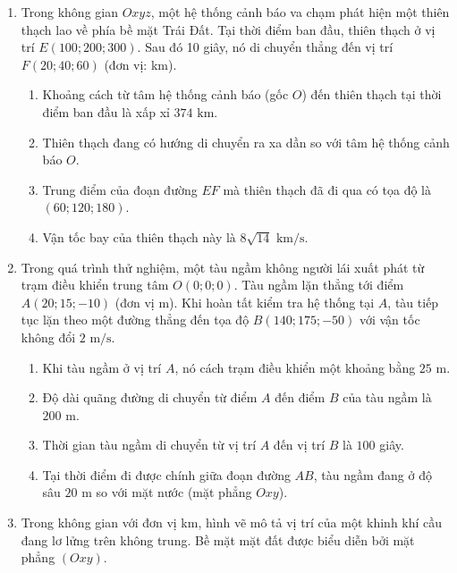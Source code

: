\documentclass[12pt]{article}
\begin{document}
\begin{enumerate}[label=\textbf{Câu \arabic*:}, leftmargin=*]
		\vspace{3mm}
		\item Trong không gian $Oxyz$, một hệ thống cảnh báo va chạm phát hiện một thiên thạch lao về phía bề mặt Trái Đất. Tại thời điểm ban đầu, thiên thạch ở vị trí $E(100; 200; 300)$. Sau đó 10 giây, nó di chuyển thẳng đến vị trí $F(20; 40; 60)$ (đơn vị: km).
		\begin{enumerate}[label=\alph*)]
			\item Khoảng cách từ tâm hệ thống cảnh báo (gốc $O$) đến thiên thạch tại thời điểm ban đầu là xấp xỉ $374\text{ km}$.
			\item Thiên thạch đang có hướng di chuyển ra xa dần so với tâm hệ thống cảnh báo $O$.
			\item Trung điểm của đoạn đường $EF$ mà thiên thạch đã đi qua có tọa độ là $(60; 120; 180)$.
			\item Vận tốc bay của thiên thạch này là $8\sqrt{14}\text{ km/s}$.
		\end{enumerate}
		
		\vspace{3mm}
		\item Trong quá trình thử nghiệm, một tàu ngầm không người lái xuất phát từ trạm điều khiển trung tâm $O(0;0;0)$. Tàu ngầm lặn thẳng tới điểm $A(20; 15; -10)$ (đơn vị m). Khi hoàn tất kiểm tra hệ thống tại $A$, tàu tiếp tục lặn theo một đường thẳng đến tọa độ $B(140; 175; -50)$ với vận tốc không đổi $2\text{ m/s}$.
		\begin{enumerate}[label=\alph*)]
			\item Khi tàu ngầm ở vị trí $A$, nó cách trạm điều khiển một khoảng bằng $25\text{ m}$.
			\item Độ dài quãng đường di chuyển từ điểm $A$ đến điểm $B$ của tàu ngầm là $200\text{ m}$.
			\item Thời gian tàu ngầm di chuyển từ vị trí $A$ đến vị trí $B$ là $100$ giây.
			\item Tại thời điểm đi được chính giữa đoạn đường $AB$, tàu ngầm đang ở độ sâu $20\text{ m}$ so với mặt nước (mặt phẳng $Oxy$).
		\end{enumerate}
		
		\vspace{3mm}
		\item Trong không gian với đơn vị km, hình vẽ mô tả vị trí của một khinh khí cầu đang lơ lửng trên không trung. Bề mặt mặt đất được biểu diễn bởi mặt phẳng $(Oxy)$.
		

\end{enumerate}
\end{document}
